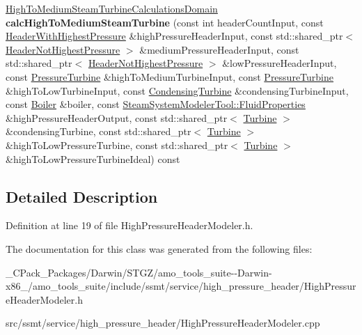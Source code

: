 \begin{DoxyCompactItemize}
\item 
\mbox{\label{class_high_pressure_header_modeler_a6a24f4385ad44c16b27bb99ab17372e1}} 
\hyperlink{class_high_to_medium_steam_turbine_calculations_domain}{High\+To\+Medium\+Steam\+Turbine\+Calculations\+Domain} {\bfseries calc\+High\+To\+Medium\+Steam\+Turbine} (const int header\+Count\+Input, const \hyperlink{class_header_with_highest_pressure}{Header\+With\+Highest\+Pressure} \&high\+Pressure\+Header\+Input, const std\+::shared\+\_\+ptr$<$ \hyperlink{class_header_not_highest_pressure}{Header\+Not\+Highest\+Pressure} $>$ \&medium\+Pressure\+Header\+Input, const std\+::shared\+\_\+ptr$<$ \hyperlink{class_header_not_highest_pressure}{Header\+Not\+Highest\+Pressure} $>$ \&low\+Pressure\+Header\+Input, const \hyperlink{class_pressure_turbine}{Pressure\+Turbine} \&high\+To\+Medium\+Turbine\+Input, const \hyperlink{class_pressure_turbine}{Pressure\+Turbine} \&high\+To\+Low\+Turbine\+Input, const \hyperlink{class_condensing_turbine}{Condensing\+Turbine} \&condensing\+Turbine\+Input, const \hyperlink{class_boiler}{Boiler} \&boiler, const \hyperlink{struct_steam_system_modeler_tool_1_1_fluid_properties}{Steam\+System\+Modeler\+Tool\+::\+Fluid\+Properties} \&high\+Pressure\+Header\+Output, const std\+::shared\+\_\+ptr$<$ \hyperlink{class_turbine}{Turbine} $>$ \&condensing\+Turbine, const std\+::shared\+\_\+ptr$<$ \hyperlink{class_turbine}{Turbine} $>$ \&high\+To\+Low\+Pressure\+Turbine, const std\+::shared\+\_\+ptr$<$ \hyperlink{class_turbine}{Turbine} $>$ \&high\+To\+Low\+Pressure\+Turbine\+Ideal) const
\end{DoxyCompactItemize}


\subsection{Detailed Description}


Definition at line 19 of file High\+Pressure\+Header\+Modeler.\+h.



The documentation for this class was generated from the following files\+:\begin{DoxyCompactItemize}
\item 
\+\_\+\+C\+Pack\+\_\+\+Packages/\+Darwin/\+S\+T\+G\+Z/amo\+\_\+tools\+\_\+suite-\/-\/\+Darwin-\/x86\+\_/amo\+\_\+tools\+\_\+suite/include/ssmt/service/high\+\_\+pressure\+\_\+header/High\+Pressure\+Header\+Modeler.\+h\item 
src/ssmt/service/high\+\_\+pressure\+\_\+header/High\+Pressure\+Header\+Modeler.\+cpp\end{DoxyCompactItemize}
